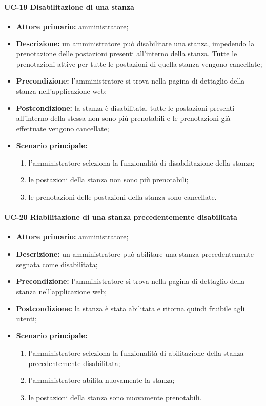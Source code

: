 \paragraph{UC-19 Disabilitazione di una stanza}
\begin{itemize}
    \item \textbf{Attore primario:} amministratore;
    \item \textbf{Descrizione:} un amministratore pu\`{o} disabilitare una stanza, impedendo la prenotazione delle postazioni presenti all'interno della stanza. Tutte le prenotazioni attive per tutte le postazioni di quella stanza vengono cancellate;
    \item \textbf{Precondizione:} l'amministratore si trova nella pagina di dettaglio della stanza nell'applicazione web;
    \item \textbf{Postcondizione:} la stanza \`{e} disabilitata, tutte le postazioni presenti all'interno della stessa non sono pi\`{u} prenotabili e le prenotazioni già effettuate vengono cancellate;
    \item \textbf{Scenario principale:}
    \begin{enumerate}
        \item l'amministratore seleziona la funzionalità di disabilitazione della stanza;
        \item le postazioni della stanza non sono pi\`{u} prenotabili;
        \item le prenotazioni delle postazioni della stanza sono cancellate.
    \end{enumerate}
\end{itemize}

\paragraph{UC-20 Riabilitazione di una stanza precedentemente disabilitata}
\begin{itemize}
    \item \textbf{Attore primario:} amministratore;
    \item \textbf{Descrizione:} un amministratore pu\`{o} abilitare una stanza precedentemente segnata come disabilitata;
    \item \textbf{Precondizione:} l'amministratore si trova nella pagina di dettaglio della stanza nell'applicazione web;
    \item \textbf{Postcondizione:} la stanza \`{e} stata abilitata e ritorna quindi fruibile agli utenti;
    \item \textbf{Scenario principale:}
    \begin{enumerate}
        \item l'amministratore seleziona la funzionalità di abilitazione della stanza precedentemente disabilitata;
        \item l'amministratore abilita nuovamente la stanza;
        \item le postazioni della stanza sono nuovamente prenotabili.
    \end{enumerate}
\end{itemize}